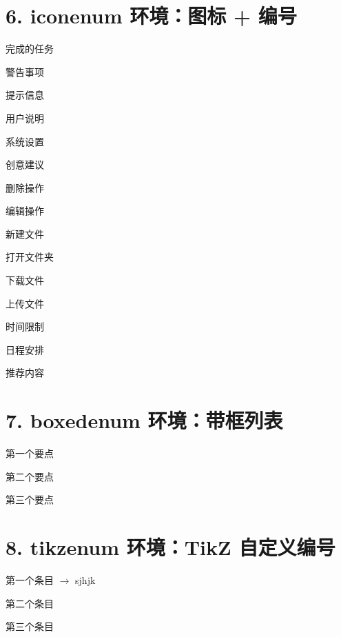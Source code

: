 	\section*{6. iconenum 环境：图标 + 编号} %
	\begin{iconenum}
		\item[\faCheckCircleO] 完成的任务
		\item[\faExclamationTriangle] 警告事项
		\item[\faInfoCircle] 提示信息
		\item[\faUser] 用户说明
		\item[\faCog] 系统设置
		\item[\faLightbulbO] 创意建议
		\item[\faTrash] 删除操作
		\item[\faPencil] 编辑操作
		\item[\faFileTextO] 新建文件
		\item[\faFolderOpen] 打开文件夹
		\item[\faDownload] 下载文件
		\item[\faUpload] 上传文件
		\item[\faClockO] 时间限制
		\item[\faCalendar] 日程安排
		\item[\faStar] 推荐内容
	\end{iconenum}

	\section*{7. boxedenum 环境：带框列表}
	\begin{boxedenum}
		\item 第一个要点
		\item 第二个要点
		\item 第三个要点
	\end{boxedenum}
	
	\section*{8. tikzenum 环境：TikZ 自定义编号}
	\begin{tikzenum}
		\item 第一个条目 $\to$ sjhjk

		\item 第二个条目
		
		
		\item 第三个条目
	\end{tikzenum}
	
